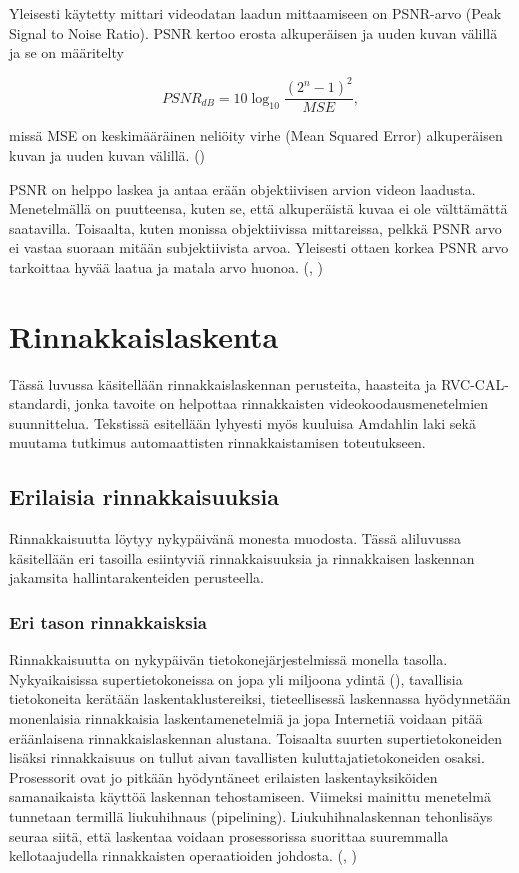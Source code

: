 Yleisesti käytetty mittari videodatan laadun mittaamiseen on PSNR-arvo (Peak
Signal to Noise Ratio). PSNR kertoo erosta alkuperäisen ja uuden kuvan välillä
ja se on määritelty

\begin{center}
\begin{equation}PSNR_{dB} = 10\log_{10}\frac{(2^n - 1)^2}{MSE},\end{equation}
\end{center}

missä MSE on keskimääräinen neliöity virhe (Mean Squared Error) alkuperäisen 
kuvan ja uuden kuvan välillä. (\citealt{h264})

PSNR on helppo laskea ja antaa erään objektiivisen arvion videon laadusta.
Menetelmällä on puutteensa, kuten se, että alkuperäistä kuvaa ei ole
välttämättä saatavilla. Toisaalta, kuten monissa objektiivissa mittareissa,
pelkkä PSNR arvo ei vastaa suoraan mitään subjektiivista arvoa. Yleisesti
ottaen korkea PSNR arvo tarkoittaa hyvää laatua ja matala arvo huonoa.
(\citealt{h264}, \citealt{du})

\section{Rinnakkaislaskenta}

Tässä luvussa käsitellään rinnakkaislaskennan perusteita, haasteita ja
RVC-CAL-standardi, jonka tavoite on helpottaa rinnakkaisten
videokoodausmenetelmien suunnittelua. Tekstissä esitellään lyhyesti
myös kuuluisa Amdahlin laki sekä muutama tutkimus automaattisten
rinnakkaistamisen toteutukseen.

\subsection{Erilaisia rinnakkaisuuksia}

Rinnakkaisuutta löytyy nykypäivänä monesta muodosta. Tässä aliluvussa
käsitellään eri tasoilla esiintyviä rinnakkaisuuksia ja rinnakkaisen laskennan
jakamsita hallintarakenteiden perusteella.

\subsubsection{Eri tason rinnakkaisksia}

Rinnakkaisuutta on nykypäivän tietokonejärjestelmissä monella tasolla.
Nykyaikaisissa supertietokoneissa on jopa yli miljoona ydintä (\citealt{top500}),
tavallisia tietokoneita kerätään laskentaklustereiksi, tieteellisessä
laskennassa hyödynnetään monenlaisia rinnakkaisia laskentamenetelmiä ja jopa
Internetiä voidaan pitää eräänlaisena rinnakkaislaskennan alustana. Toisaalta
suurten supertietokoneiden lisäksi rinnakkaisuus on tullut aivan tavallisten
kuluttajatietokoneiden osaksi. Prosessorit ovat jo pitkään hyödyntäneet
erilaisten laskentayksiköiden samanaikaista käyttöä laskennan tehostamiseen.
Viimeksi mainittu menetelmä tunnetaan termillä liukuhihnaus (pipelining).
Liukuhihnalaskennan tehonlisäys seuraa siitä, että laskentaa voidaan
prosessorissa suorittaa suuremmalla kellotaajudella rinnakkaisten operaatioiden
johdosta. (\citealt{intro}, \citealt{rauber})

